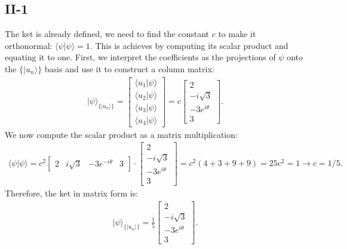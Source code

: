 \documentclass[letterpaper,11pt,twoside]{article}
\newcommand{\ket}[1]{|#1\rangle}
\newcommand{\braket}[1]{\langle#1\rangle}
\begin{document}
\subsection*{II-1}
  The ket is already defined, we need to find the constant $c$ to make it orthonormal: $\braket{\psi|\psi}=1$.
  This is achieves by computing its scalar product and equating it to one. First, we interpret the coefficients as the projections of $\psi$ onto the 
  $\{\ket{u_n}\}$ basis and use it to construct a column matrix:
  \begin{align*}
    \ket{\psi}_{\{\ket{u_n}\}}=\begin{bmatrix}
      \braket{u_1|\psi}\\\braket{u_2|\psi}\\\braket{u_3|\psi}\\\braket{u_4|\psi}
    \end{bmatrix}=c\begin{bmatrix}
      2\\-i\sqrt{3}\\-3e^{i\theta}\\3
    \end{bmatrix}.
  \end{align*}
  We now compute the scalar product as a matrix multiplication:
  \begin{align*}
    \braket{\psi|\psi}=c^2\begin{bmatrix}
      2&i\sqrt{3}&-3e^{-i\theta}&3
    \end{bmatrix}\cdot\begin{bmatrix}
      2\\-i\sqrt{3}\\-3e^{i\theta}\\3
    \end{bmatrix}=c^2(4+3+9+9)=25c^2=1\longrightarrow c=1/5.
  \end{align*}
  Therefore, the ket in matrix form is:
  \begin{align}
    \ket{\psi}_{\{\ket{u_n}\}}=\frac{1}{5}\begin{bmatrix}
      2\\-i\sqrt{3}\\-3e^{i\theta}\\3
    \end{bmatrix}.
  \end{align}
\end{document}
